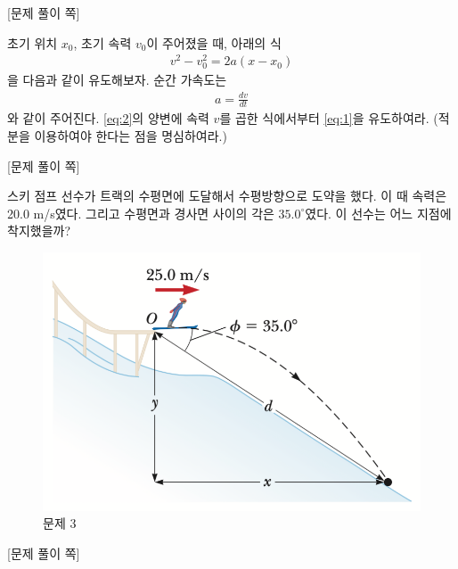 \documentclass[floatfix,nofootinbib,superscriptaddress,fleqn,preprint]{revtex4}
\begin{document}
\newpage

{\color{gray} [문제 풀이 쪽]}

\newpage 

 초기 위치 $x_0$, 초기 속력 $v_0$이
주어졌을 때, 아래의 식
\begin{align}
  \label{eq:1}
v^2 - v_0^2 = 2a(x-x_0)  
\end{align}
을 다음과 같이 유도해보자. 순간 가속도는
\begin{align}
  \label{eq:2}
a = \frac{dv}{dt}
\end{align}
와 같이 주어진다. \eqref{eq:2}의 양변에 속력 $v$를 곱한 식에서부터
\eqref{eq:1}을 유도하여라. (적분을 이용하여야 한다는 점을 명심하여라.)
\newpage

{\color{gray} [문제 풀이 쪽]}

\newpage 

스키 점프 선수가 트랙의 수평면에 도달해서
수평방향으로 도약을 했다. 이 때 속력은 20.0 m/s였다. 그리고 수평면과
경사면 사이의 각은 $35.0^\circ$였다. 이 선수는 어느 지점에 착지했을까? 
\begin{figure}[ht]
  \centering
\includegraphics[scale=0.6]{Qfig4-3.pdf}  
  \caption{문제 3}
  \label{fig:2}
\end{figure}
\newpage

{\color{gray} [문제 풀이 쪽]}

\newpage
\end{document}
